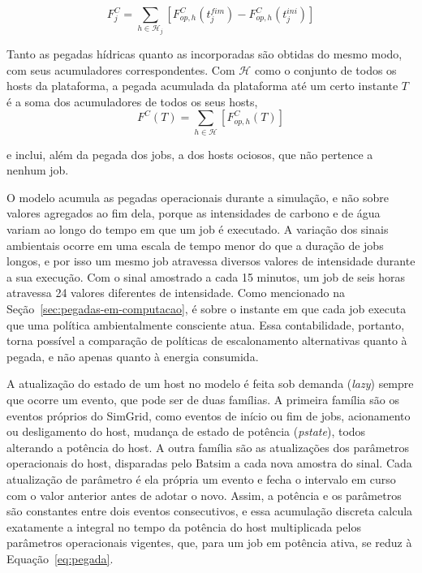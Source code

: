 \begin{equation}
    F^{C}_{j} = \sum_{h \in \mathcal{H}_{j}}
        \left[ F^{C}_{op,h}(t^{fim}_{j}) - F^{C}_{op,h}(t^{ini}_{j}) \right]
    \label{eq:pegada-carbono-job}
\end{equation}

Tanto as pegadas hídricas quanto as incorporadas são obtidas do mesmo modo, com seus acumuladores correspondentes. 
Com $\mathcal{H}$ como o conjunto de todos os hosts da plataforma, a pegada acumulada da 
plataforma até um certo instante $T$ é a soma dos acumuladores de todos os seus hosts,
\begin{equation}
    F^{C}(T) = \sum_{h \in \mathcal{H}}
        \left[ F^{C}_{op,h}(T) \right]
    \label{eq:pegada-carbono-plataforma}
\end{equation}

e inclui, além da pegada dos jobs, a dos hosts ociosos, que não pertence a nenhum job.

O modelo acumula as pegadas operacionais durante a simulação, e não sobre valores
agregados ao fim dela, porque as intensidades de carbono e de água variam ao 
longo do tempo em que um job é executado. A variação dos sinais ambientais ocorre em uma escala de tempo menor do que a duração de jobs
longos, e por isso um mesmo job atravessa diversos valores de intensidade durante a sua
execução. Com o sinal amostrado a cada 15 minutos, um job de 
seis horas atravessa 24 valores diferentes de intensidade. Como mencionado 
na Seção~\ref{sec:pegadas-em-computacao}, é sobre o instante em que cada job executa que uma política 
ambientalmente consciente atua. Essa contabilidade, portanto,
torna possível a comparação de políticas de escalonamento alternativas quanto à pegada,
e não apenas quanto à energia consumida.

A atualização do estado de um host no modelo é feita sob demanda (\textit{lazy}) sempre 
que ocorre um evento, que pode ser de duas famílias. A primeira família 
são os eventos próprios do SimGrid, como eventos de início 
ou fim de jobs, acionamento ou desligamento do host, mudança de estado de potência (\textit{pstate}), todos 
alterando a potência do host. A outra família são as atualizações dos parâmetros 
operacionais do host, disparadas pelo
Batsim a cada nova amostra do sinal. Cada atualização de parâmetro é
ela própria um evento e fecha o intervalo em curso com o valor anterior antes
de adotar o novo. Assim, a potência e os parâmetros são constantes entre dois eventos consecutivos, e 
essa acumulação discreta calcula exatamente a integral no tempo da potência do host multiplicada pelos parâmetros
operacionais vigentes, que, para um job em potência ativa, se reduz à Equação~\ref{eq:pegada}.

